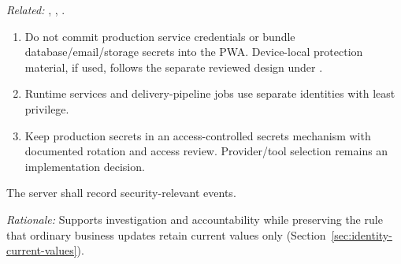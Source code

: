 \textit{Related:} \hyperref[fr:001]{}, \hyperref[fr:005]{}, \hyperref[fr:040]{}.
\begin{enumerate}[label=(\alph*),leftmargin=*,itemsep=1pt,topsep=3pt]
\item Do not commit production service credentials or bundle database/email/storage secrets into the PWA. Device-local protection material, if used, follows the separate reviewed design under .
\item Runtime services and delivery-pipeline jobs use separate identities with least privilege.
\item Keep production secrets in an access-controlled secrets mechanism with documented rotation and access review. Provider/tool selection remains an implementation decision.
\end{enumerate}

\label{nfr:SEC-07}
The server shall record security-relevant events.

\textit{Rationale:} Supports investigation and accountability while preserving the rule that ordinary business updates retain current values only (Section~\ref{sec:identity-current-values}).

